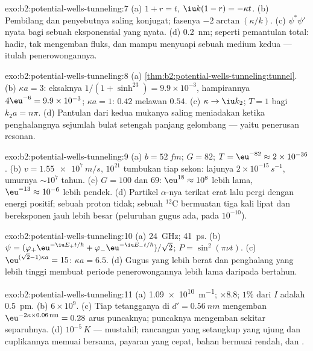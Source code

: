 \begin{solution}{exo:b2:potential-wells-tunneling:7}
(a) $1 + r = t$, $\iu k(1 - r) = -\kappa t$. (b) Pembilang dan penyebutnya
saling konjugat; fasenya $-2\arctan(\kappa/k)$. (c) $\psi^*\psi'$ nyata bagi sebuah
eksponensial yang nyata. (d) \qty{0.2}{nm}; seperti  pemantulan
total: hadir, tak mengemban fluks, dan mampu menyuapi sebuah medium kedua
--- itulah penerowongannya.
\end{solution}

\begin{solution}{exo:b2:potential-wells-tunneling:8}
(a) \cref{thm:b2:potential-wells-tunneling:tunnel}. (b) $\kappa a = 3$:
eksaknya $1/(1 + \sinh^23) = 9.9 \times 10^{-3}$, hampirannya $4\eu^{-6} = 9.9 \times
10^{-3}$; $\kappa a = 1$: $0.42$ melawan $0.54$. (c) $\kappa \to \iu k_2$; $T = 1$
bagi $k_2a = n\pi$. (d) Pantulan dari kedua mukanya saling meniadakan ketika
penghalangnya sejumlah bulat setengah panjang gelombang --- yaitu penerusan
resonan.
\end{solution}

\begin{solution}{exo:b2:potential-wells-tunneling:9}
(a) $b = \qty{52}{fm}$; $G = 82$; $T = \eu^{-82} \approx 2 \times 10^{-36}$. (b) $v =
\qty{1.55e7}{m/s}$, $10^{21}$ tumbukan tiap sekon: lajunya $2 \times 10^{-15}\,\unit{s^{-1}}$,
umurnya $\sim 10^7$ tahun. (c) $G = 100$ dan $69$: $\eu^{18} \approx 10^8$ lebih lama,
$\eu^{-13} \approx 10^{-6}$ lebih pendek. (d) Partikel $\alpha$-nya terikat erat lalu pergi
dengan energi positif; sebuah proton tidak; sebuah $^{12}$C bermuatan tiga kali lipat
dan bereksponen jauh lebih besar (peluruhan gugus ada, pada $10^{-10}$).
\end{solution}

\begin{solution}{exo:b2:potential-wells-tunneling:10}
(a) \qty{24}{GHz}; \qty{41}{ps}. (b) $\psi = (\varphi_+\eu^{-\iu E_+t/\hbar} +
\varphi_-\eu^{-\iu E_-t/\hbar})/\sqrt2$; $P = \sin^2(\pi\nu t)$. (c) $\eu^{(\sqrt2 - 1)
\kappa a} = 15$: $\kappa a = 6.5$. (d) Gugus yang lebih berat dan penghalang yang lebih tinggi membuat
periode penerowongannya lebih lama daripada bertahun.
\end{solution}

\begin{solution}{exo:b2:potential-wells-tunneling:11}
(a) \qty{1.09e10}{m^{-1}}; $\times 8.8$; $1\%$ dari $I$ adalah \qty{0.5}{pm}. (b) $6 \times 10^9$.
(c) Tiap tetangganya di $d' = \qty{0.56}{nm}$ mengemban $\eu^{-2\kappa \times 0.06\,\text{nm}}
= 0.28$ arus puncaknya; puncaknya mengemban sekitar separuhnya. (d)
$10^{-5}\,\unit{K}$ --- mustahil; rancangan yang setangkup yang ujung dan cuplikannya
memuai bersama, payaran yang cepat, bahan bermuai rendah, dan .
\end{solution}

